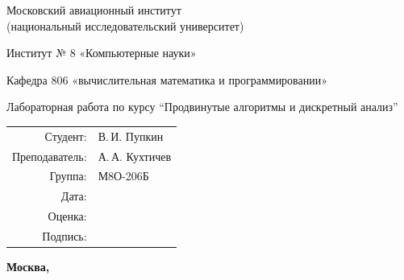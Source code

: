 \begin{titlepage}
\begin{center}
\bfseries

{\Large Московский авиационный институт\\ (национальный исследовательский университет)

}

\vspace{48pt}

{\large Институт № 8 «Компьютерные науки»
}

\vspace{36pt}

{\large Кафедра 806 «вычислительная математика и программировании»

}


\vspace{48pt}

Лабораторная работа  по курсу \enquote{Продвинутые алгоритмы и дискретный анализ}

\end{center}

\vspace{72pt}

\begin{flushright}
\begin{tabular}{rl}
Студент: & В.\,И. Пупкин \\
Преподаватель: & А.\,А. Кухтичев \\
Группа: & М8О-206Б \\
Дата: & \\
Оценка: & \\
Подпись: & \\
\end{tabular}
\end{flushright}

\vfill

\begin{center}
\bfseries
Москва, \the\year
\end{center}
\end{titlepage}

\pagebreak
